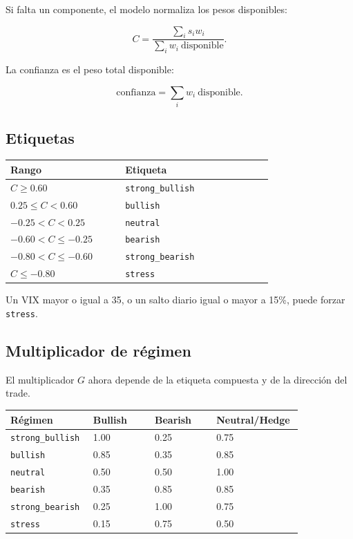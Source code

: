 \documentclass[11pt,letterpaper]{article}
\begin{document}
Si falta un componente, el modelo normaliza los pesos disponibles:

\[
C = \frac{\sum_i s_i w_i}{\sum_i w_i\ \text{disponible}}.
\]

La confianza es el peso total disponible:

\[
\text{confianza} = \sum_i w_i\ \text{disponible}.
\]

\subsection{Etiquetas}

\begin{longtable}{p{0.35\linewidth} p{0.45\linewidth}}
\toprule
\textbf{Rango} & \textbf{Etiqueta} \\
\midrule
$C \ge 0.60$ & \texttt{strong\_bullish} \\
$0.25 \le C < 0.60$ & \texttt{bullish} \\
$-0.25 < C < 0.25$ & \texttt{neutral} \\
$-0.60 < C \le -0.25$ & \texttt{bearish} \\
$-0.80 < C \le -0.60$ & \texttt{strong\_bearish} \\
$C \le -0.80$ & \texttt{stress} \\
\bottomrule
\end{longtable}

Un VIX mayor o igual a 35, o un salto diario igual o mayor a 15\%, puede forzar
\texttt{stress}.

\subsection{Multiplicador de r\'egimen}

El multiplicador $G$ ahora depende de la etiqueta compuesta y de la direcci\'on
del trade.

\begin{longtable}{p{0.24\linewidth} p{0.20\linewidth} p{0.20\linewidth} p{0.20\linewidth}}
\toprule
\textbf{R\'egimen} & \textbf{Bullish} & \textbf{Bearish} & \textbf{Neutral/Hedge} \\
\midrule
\texttt{strong\_bullish} & 1.00 & 0.25 & 0.75 \\
\texttt{bullish} & 0.85 & 0.35 & 0.85 \\
\texttt{neutral} & 0.50 & 0.50 & 1.00 \\
\texttt{bearish} & 0.35 & 0.85 & 0.85 \\
\texttt{strong\_bearish} & 0.25 & 1.00 & 0.75 \\
\texttt{stress} & 0.15 & 0.75 & 0.50 \\
\bottomrule
\end{longtable}
\end{document}

